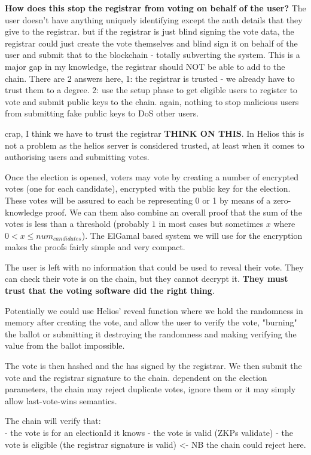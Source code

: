 {    \textbf{How does this stop the registrar from voting on behalf of the user?} The user doesn't have anything uniquely identifying except the auth details that they give to the registrar. but if the registrar is just blind signing the vote data, the registrar could just create the vote themselves and blind sign it on behalf of the user and submit that to the blockchain - totally subverting the system. This is a major gap in my knowledge, the registrar should NOT be able to add to the chain. There are 2 answers here, 1: the registrar is trusted - we already have to trust them to a degree. 2: use the setup phase to get eligible users to register to vote and submit public keys to the chain. again, nothing to stop malicious users from submitting fake public keys to DoS other users.

    crap, I think we have to trust the registrar \textbf{THINK ON THIS}. In Helios this is not a problem as the helios server is considered trusted, at least when it comes to authorising users and submitting votes.

    Once the election is opened, voters may vote by creating a number of encrypted votes (one for each candidate), encrypted with the public key for the election. These votes will be assured to each be representing 0 or 1 by means of a zero-knowledge proof. We can them also combine an overall proof that the sum of the votes is less than a threshold (probably $1$ in most cases but sometimes $x$ where $0 < x \le num_{candidates}$). The ElGamal based system we will use for the encryption makes the proofs fairly simple and very compact.

    The user is left with no information that could be used to reveal their vote. They can check their vote is on the chain, but they cannot decrypt it. \textbf{They must trust that the voting software did the right thing}.

    Potentially we could use Helios' reveal function where we hold the randomness in memory after creating the vote, and allow the user to verify the vote, "burning" the ballot or submitting it destroying the randomness and making verifying the value from the ballot impossible.

    The vote is then hashed and the has signed by the registrar. We then submit the vote and the registrar signature to the chain. dependent on the election parameters, the chain may reject duplicate votes, ignore them or it may simply allow last-vote-wins semantics.

    The chain will verify that: \\
    - the vote is for an electionId it knows
    - the vote is valid (ZKPs validate)
    - the vote is eligible (the registrar signature is valid) <- NB the chain could reject here.

}
